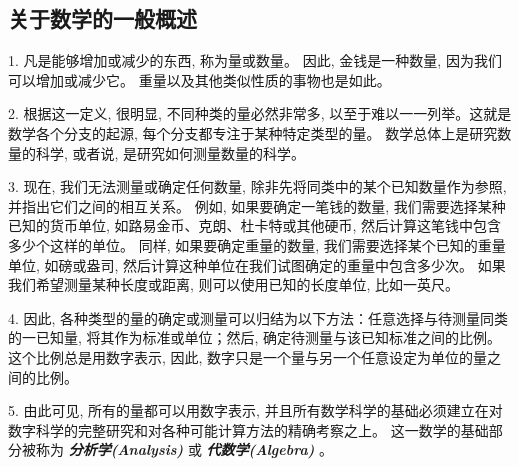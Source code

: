 \subsection{关于数学的一般概述}


1. 凡是能够增加或减少的东西, 称为量或数量。
因此, 金钱是一种数量, 因为我们可以增加或减少它。
重量以及其他类似性质的事物也是如此。


2. 根据这一定义, 很明显, 不同种类的量必然非常多, 
以至于难以一一列举。这就是数学各个分支的起源, 每个分支都专注于某种特定类型的量。
数学总体上是研究数量的科学, 或者说, 是研究如何测量数量的科学。


3. 现在, 我们无法测量或确定任何数量, 除非先将同类中的某个已知数量作为参照, 并指出它们之间的相互关系。
例如, 如果要确定一笔钱的数量, 我们需要选择某种已知的货币单位, 
如路易金币、克朗、杜卡特或其他硬币, 然后计算这笔钱中包含多少个这样的单位。
同样, 如果要确定重量的数量, 我们需要选择某个已知的重量单位, 
如磅或盎司, 然后计算这种单位在我们试图确定的重量中包含多少次。
如果我们希望测量某种长度或距离, 则可以使用已知的长度单位, 比如一英尺。


4. 因此, 各种类型的量的确定或测量可以归结为以下方法：任意选择与待测量同类的一已知量, 
将其作为标准或单位；然后, 确定待测量与该已知标准之间的比例。
这个比例总是用数字表示, 因此, 数字只是一个量与另一个任意设定为单位的量之间的比例。


5. 由此可见, 所有的量都可以用数字表示, 
并且所有数学科学的基础必须建立在对数字科学的完整研究和对各种可能计算方法的精确考察之上。
这一数学的基础部分被称为 \textbf{\textit{分析学(Analysis)}} 或 \textbf{\textit{代数学(Algebra)}} 。

